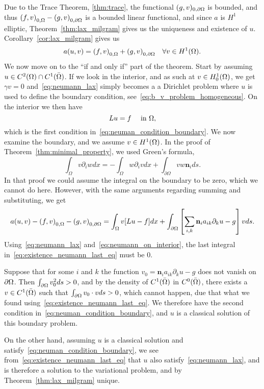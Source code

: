 \begin{bev}
   Due to the Trace Theorem, \ref{thm:trace}, the functional $(g,v)_{0,\partial \Omega}$ is bounded,
   and thus $ {(f,v)}_{0,\Omega} - {(g,v)}_{0,\partial\Omega}$ is a bounded linear functional, 
   and since $a$ is $H^1$ elliptic, Theorem~\ref{thm:lax_milgram} gives us the
   uniqueness and existence of $u$.
   Corollary~\ref{cor:lax_milgram} gives us
   \begin{equation}
      a(u,v) = {(f,v)}_{0,\Omega} + {(g,v)}_{0,\partial\Omega} \quad \forall v \in H^1(\Omega). \label{eq:neumann_lax}
   \end{equation}
   We now move on to the ``if and only if'' part of the theorem. Start by 
   assuming $u \in C^2(\Omega)\cap C^1(\bar{\Omega})$.
   If we look in the interior, and as such at $v \in H^1_0(\Omega)$, we get $\gamma v=0$ 
   and~\eqref{eq:neumann_lax} simply becomes a a Dirichlet problem where 
   $u$ is used to define the boundary condition, see~\eqref{eq:b_v_problem_homogeneous}.
   On the interior we then have 
   \begin{equation}
    Lu = f \quad \text{ in }\Omega, \label{eq:neumann_on_interior}
   \end{equation} 
   which is the first condition in~\eqref{eq:neuman_condition_boundary}.
   We now examine the boundary, and we assume $v\in H^1(\Omega)$.
   In the proof of Theorem~\ref{thm:minimal_property}, we used Green's formula,
    \begin{equation} %
        \int_\Omega v\partial_i w dx = -\int_\Omega w \partial_i v dx + \int_{\partial \Omega} v w \mathbf{n}_i ds.
    \end{equation}
   In that proof we could assume the integral on the boundary to be zero, which 
   we cannot do here. However, with the same arguments regarding summing and substituting, 
   we get
   \begin{equation}
      a(u,v) - {(f,v)}_{0,\Omega} - {(g,v)}_{0,\partial\Omega} = 
      \int_\Omega v[Lu - f] dx + \int_{\partial \Omega}
     \left[ \sum_{i,k}  \mathbf{n}_i a_{ik} \partial_k u-g \right]v ds.
     \label{eq:existence_neumann_last_eq}
   \end{equation}
   Using~\eqref{eq:neumann_lax} and~\eqref{eq:neumann_on_interior},
   the last integral in~\eqref{eq:existence_neumann_last_eq} must be $0$.

   Suppose that for some $i$ and $k$ the function $v_0 = \mathbf{n}_i a_{ik} \partial_k u -g$ does 
   not vanish on $\partial \Omega$. 
   Then $\int_{\partial\Omega}v_0^2ds>0$, and by the density of 
   $C^1(\bar{\Omega})$ in $C^0(\bar{\Omega})$, there exists a $v\in C^1(\bar{\Omega})$
   such that  $\int_{\partial\Omega}v_0\cdot vds>0$, which cannot happen, due that 
   what we found using~\eqref{eq:existence_neumann_last_eq}. 
   We therefore have the second condition in~\eqref{eq:neuman_condition_boundary},
   and $u$ is a classical solution of this boundary problem.

   On the other hand, assuming $u$ is a classical solution and satisfy~\eqref{eq:neuman_condition_boundary},
   we see from~\eqref{eq:existence_neumann_last_eq} that $u$ also satisfy~\eqref{eq:neumann_lax}, and is therefore a solution to the variational 
   problem, and by Theorem~\ref{thm:lax_milgram} unique.
\end{bev}